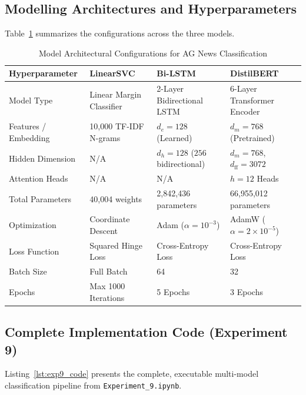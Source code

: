 \subsection{Modelling Architectures and Hyperparameters}
Table~\ref{tab:exp9_models} summarizes the configurations across the three models.

\begin{table}[H]
\centering
\caption{Model Architectural Configurations for AG News Classification}
\label{tab:exp9_models}
\begin{tabularx}{\textwidth}{lXXX}
\toprule
\textbf{Hyperparameter} & \textbf{LinearSVC} & \textbf{Bi-LSTM} & \textbf{DistilBERT} \\
\midrule
Model Type & Linear Margin Classifier & 2-Layer Bidirectional LSTM & 6-Layer Transformer Encoder \\
Features / Embedding & 10,000 TF-IDF N-grams & $d_e = 128$ (Learned) & $d_m = 768$ (Pretrained) \\
Hidden Dimension & N/A & $d_h = 128$ ($256$ bidirectional) & $d_m = 768$, $d_{\text{ff}} = 3072$ \\
Attention Heads & N/A & N/A & $h = 12$ Heads \\
Total Parameters & 40,004 weights & 2,842,436 parameters & 66,955,012 parameters \\
Optimization & Coordinate Descent & Adam ($\alpha = 10^{-3}$) & AdamW ($\alpha = 2 \times 10^{-5}$) \\
Loss Function & Squared Hinge Loss & Cross-Entropy Loss & Cross-Entropy Loss \\
Batch Size & Full Batch & 64 & 32 \\
Epochs & Max 1000 Iterations & 5 Epochs & 3 Epochs \\
\bottomrule
\end{tabularx}
\end{table}

\subsection{Complete Implementation Code (Experiment 9)}
Listing~\ref{lst:exp9_code} presents the complete, executable multi-model classification pipeline from \texttt{Experiment\_9.ipynb}.

